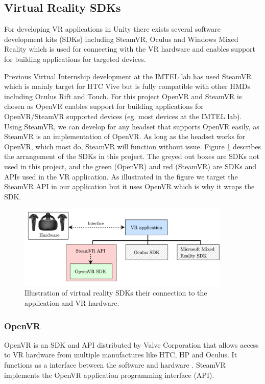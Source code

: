 \subsection{Virtual Reality SDKs}
\label{section:sdks}
For developing VR applications in Unity there exists several software development kits (SDKs) including SteamVR, Oculus and Windows Mixed Reality which is used for connecting with the VR hardware and enables support for building applications for targeted devices.  


Previous Virtual Internship development at the IMTEL lab has used SteamVR which is mainly target for HTC Vive but is fully compatible with other HMDs including Oculus Rift and Touch. For this project OpenVR and SteamVR is chosen as OpenVR enables support for building applications for OpenVR/SteamVR supported devices (eg. most devices at the IMTEL lab). Using SteamVR, we can develop for any headset that supports OpenVR easily, as SteamVR is an implementation of OpenVR. As long as the headset works for OpenVR, which most do, SteamVR will function without issue. Figure \ref{fig:vr_sdk} describes the arrangement of the SDKs in this project. The greyed out boxes are SDKs not used in this project, and the green (OpenVR) and red (SteamVR) are SDKs and APIs used in the VR application. As illustrated in the figure we target the SteamVR API in our application but it uses OpenVR which is why it wraps the SDK.

\begin{figure}[!ht]
    \centering
    \includegraphics[width=0.9\textwidth]{./fig/background/VR_sdk.png}
    \caption{Illustration of virtual reality SDKs their connection to the application and VR hardware. }
    \label{fig:vr_sdk}
\end{figure}

\subsubsection{OpenVR}
OpenVR is an SDK and API distributed by Valve Corporation that allows access to VR hardware from multiple manufactures like HTC, HP and Oculus. It functions as a interface between the software and hardware \cite{openVRsdk}. SteamVR implements the OpenVR application programming interface (API).  

